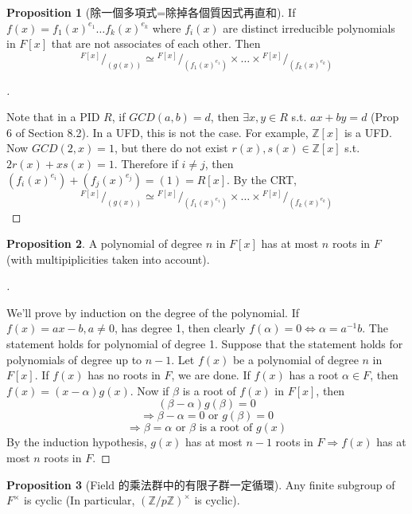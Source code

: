 \documentclass{article}
\theoremstyle{definition}
\newtheorem{prop}{Proposition}
\newenvironment{proofs}[1][\proofname]{%
  \begin{proof}[#1]$ $\par\nobreak\ignorespaces
}{%
  \end{proof}
}
\newcommand*\quot[2]{{^{\textstyle #1}\big/_{\textstyle #2}}}
\begin{document}
  
  
  \begin{prop}[除一個多項式=除掉各個質因式再直和]
	If $f(x) =f_1(x)^{e_1} \hdots f_k(x)^{e_k}$ where $f_i(x)$ are distinct irreducible polynomials in $F[x]$ that are not associates of each other. Then
	\[
	  \quot{F[x]}{(g(x))} \simeq \quot{F[x]}{(f_1(x)^{e_1})} \times \hdots \times \quot{F[x]}{(f_k(x)^{e_k})}
	\]
  \end{prop}
  
  \begin{proofs}
	Note that in a PID $R$, if $GCD(a, b) = d$, then $\exists x, y \in R$ s.t. $ax + by = d$ (Prop 6 of Section 8.2). In a UFD, this is not the case. For example, $\mathbb{Z}[x]$ is a UFD. Now $GCD(2, x) = 1$, but there do not exist $r(x), s(x) \in \mathbb{Z}[x]$ s.t. $2r(x) + xs(x) = 1$. Therefore if $i \neq j$, then $(f_i(x)^{e_i}) + (f_j(x)^{e_j}) = (1) = R[x]$. By the CRT,  
	\[
	  \quot{F[x]}{(g(x))} \simeq \quot{F[x]}{(f_1(x)^{e_1})} \times \hdots \times \quot{F[x]}{(f_k(x)^{e_k})}
	\]
  \end{proofs}
  
  \begin{prop}
	A polynomial of degree $n$ in $F[x]$ has at most $n$ roots in $F$ (with multipiplicities taken into account).  
  \end{prop}
  
  \begin{proofs}
	We'll prove by induction on the degree of the polynomial. If $f(x) = ax - b, a \neq 0$, has degree 1, then clearly $f(\alpha) = 0 \Leftrightarrow \alpha = a^{-1} b$. The statement holds for polynomial of degree 1. Suppose that the statement holds for polynomials of degree up to $n - 1$. Let $f(x)$ be a polynomial of degree $n$ in $F[x]$. If $f(x)$ has no roots in $F$, we are done. If $f(x)$ has a root $\alpha \in F$, then $f(x) = (x - \alpha) g(x)$. Now if $\beta$ is a root of $f(x)$ in $F[x]$, then 
	\[
	  (\beta - \alpha) g(\beta) = 0
	\]
	\[
	  \Rightarrow \beta - \alpha = 0 \text{ or } g(\beta) = 0
	\]
	\[
	  \Rightarrow \beta = \alpha \text{ or } \beta \text{ is a root of } g(x)
	\]
	By the induction hypothesis, $g(x)$ has at most $n - 1$ roots in $F \Rightarrow f(x)$ has at most $n$ roots in $F$. 
  \end{proofs}
  
  \begin{prop}[Field 的乘法群中的有限子群一定循環]
	Any finite subgroup of $F^\times$ is cyclic (In particular, $(\mathbb{Z}/p\mathbb{Z})^\times$ is cyclic). 
  \end{prop}
  
\end{document}
